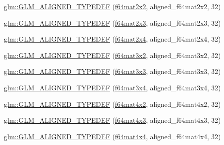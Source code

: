 \begin{DoxyCompactItemize}
\item 
\hyperlink{group__gtx__type__aligned_gadbd2c639c03de1c3e9591b5a39f65559}{glm\+::\+G\+L\+M\+\_\+\+A\+L\+I\+G\+N\+E\+D\+\_\+\+T\+Y\+P\+E\+D\+EF} (\hyperlink{group__gtc__type__precision_gae18de078e2885803ceda215c6e04a08a}{f64mat2x2}, aligned\+\_\+f64mat2x2, 32)
\item 
\hyperlink{group__gtx__type__aligned_gab059d7b9fe2094acc563b7223987499f}{glm\+::\+G\+L\+M\+\_\+\+A\+L\+I\+G\+N\+E\+D\+\_\+\+T\+Y\+P\+E\+D\+EF} (\hyperlink{group__gtc__type__precision_ga7816d266eaf216e384c3c6d1e570b9f3}{f64mat2x3}, aligned\+\_\+f64mat2x3, 32)
\item 
\hyperlink{group__gtx__type__aligned_gabbc811d1c52ed2b8cfcaff1378f75c69}{glm\+::\+G\+L\+M\+\_\+\+A\+L\+I\+G\+N\+E\+D\+\_\+\+T\+Y\+P\+E\+D\+EF} (\hyperlink{group__gtc__type__precision_gae075a2083e1801ada5c99c91f79eb6ed}{f64mat2x4}, aligned\+\_\+f64mat2x4, 32)
\item 
\hyperlink{group__gtx__type__aligned_ga9ddf5212777734d2fd841a84439f3bdf}{glm\+::\+G\+L\+M\+\_\+\+A\+L\+I\+G\+N\+E\+D\+\_\+\+T\+Y\+P\+E\+D\+EF} (\hyperlink{group__gtc__type__precision_ga311a3bf48bfe2c95150e9f71db9063c5}{f64mat3x2}, aligned\+\_\+f64mat3x2, 32)
\item 
\hyperlink{group__gtx__type__aligned_gad1dda32ed09f94bfcf0a7d8edfb6cf13}{glm\+::\+G\+L\+M\+\_\+\+A\+L\+I\+G\+N\+E\+D\+\_\+\+T\+Y\+P\+E\+D\+EF} (\hyperlink{group__gtc__type__precision_ga3b494201796c4200886e59f9695ecff0}{f64mat3x3}, aligned\+\_\+f64mat3x3, 32)
\item 
\hyperlink{group__gtx__type__aligned_ga5875e0fa72f07e271e7931811cbbf31a}{glm\+::\+G\+L\+M\+\_\+\+A\+L\+I\+G\+N\+E\+D\+\_\+\+T\+Y\+P\+E\+D\+EF} (\hyperlink{group__gtc__type__precision_gaddb7f46e5a007c31348305de542e0d52}{f64mat3x4}, aligned\+\_\+f64mat3x4, 32)
\item 
\hyperlink{group__gtx__type__aligned_ga41e82cd6ac07f912ba2a2d45799dcf0d}{glm\+::\+G\+L\+M\+\_\+\+A\+L\+I\+G\+N\+E\+D\+\_\+\+T\+Y\+P\+E\+D\+EF} (\hyperlink{group__gtc__type__precision_ga704001c2ed5838498ff61f55995fed3a}{f64mat4x2}, aligned\+\_\+f64mat4x2, 32)
\item 
\hyperlink{group__gtx__type__aligned_ga0892638d6ba773043b3d63d1d092622e}{glm\+::\+G\+L\+M\+\_\+\+A\+L\+I\+G\+N\+E\+D\+\_\+\+T\+Y\+P\+E\+D\+EF} (\hyperlink{group__gtc__type__precision_gaf9b2bfbb2c79a39c693e2ab2bedf30e5}{f64mat4x3}, aligned\+\_\+f64mat4x3, 32)
\item 
\hyperlink{group__gtx__type__aligned_ga912a16432608b822f1e13607529934c1}{glm\+::\+G\+L\+M\+\_\+\+A\+L\+I\+G\+N\+E\+D\+\_\+\+T\+Y\+P\+E\+D\+EF} (\hyperlink{group__gtc__type__precision_ga5fc21633b1546e4599609c47b4c8dac4}{f64mat4x4}, aligned\+\_\+f64mat4x4, 32)

\end{DoxyCompactItemize}
